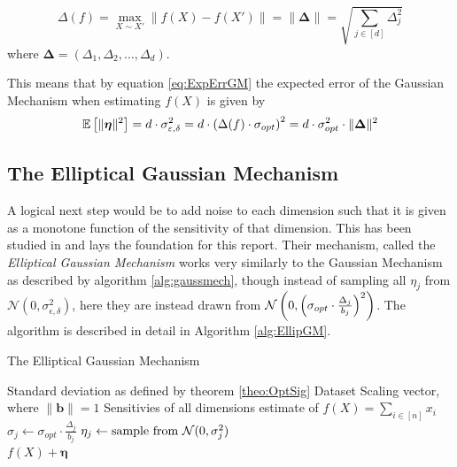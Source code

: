 \documentclass[a4paper,12pt]{article}
\newcommand{\Desc}[2]{\State \makebox[6em][l]{#1}#2}
\begin{document}
\begin{equation}
\label{eq:DelF}
    \Delta(f) = \max_{X \sim X'} \| f(X) - f(X') \| = 
    \|\bm{\Delta}\| =  \sqrt{\sum_{j \in [d]} \Delta_j^2} 
\end{equation}
where $\bm{\Delta} = (\Delta_1, \Delta_2, \dots, \Delta_d)$.

\noindent This means that by equation \eqref{eq:ExpErrGM} the expected error of the Gaussian Mechanism when estimating $f(X)$ is given by
\begin{equation}
\label{eq:GMErr}
    \mathbb{E} \left [ \| \bm{\eta} \|^2 \right] = d \cdot \sigma_{\varepsilon, \delta}^2 = d \cdot \left (\Delta(f) \cdot \sigma_{opt}\right)^2 =
    d  \cdot \sigma_{opt}^2 \cdot \| \bm{\Delta} \|^2 
\end{equation}
\subsection{The Elliptical Gaussian Mechanism}
A logical next step would be to add noise to each dimension such that it is given as a monotone function of the sensitivity of that dimension.
This has been studied in \cite{Lebeda2022} and lays the foundation for this report. Their mechanism, called the \textit{Elliptical Gaussian Mechanism}
works very similarly to the Gaussian Mechanism as described by algorithm \ref{alg:gaussmech}, though instead of sampling all $\eta_j$ from 
$\mathcal{N}(0,\sigma_{\epsilon, \delta}^2)$, here they are instead drawn from $\mathcal{N}\left (0,\left (\sigma_{opt}\cdot \frac{\Delta_j}{b_j}\right)^2\right)$. 
The algorithm is described in detail in Algorithm \ref{alg:EllipGM}.

\begin{algorithm}
\caption{The Elliptical Gaussian Mechanism}\label{alg:EllipGM}
\begin{algorithmic}
    \Input
    \Desc{$\sigma_{opt}$}{Standard deviation as defined by theorem \ref{theo:OptSig}}
    \Desc{$X \in \R^{n \times d}$}{Dataset}
    \Desc{$\bm{b} \in \R^{d}$}{Scaling vector, where $\|\bm{b}\| = 1$}
    \Desc{$\bm{\Delta} \in \R^{d}$}{Sensitivies of all dimensions}
    \EndInput
    \Output
    \State \edp estimate of $f(X) = \sum_{i \in [n]} x_i$
    \EndOutput
        \State $\sigma_j \gets \sigma_{opt} \cdot \frac{\Delta_j}{b_j}$
        \State $\eta_j \gets \textnormal{sample from } \mathcal{N}(0, \sigma_j^2)$
    \EndFor \\
    \Return $f(X) + \bm{\eta}$
\end{algorithmic}
\end{algorithm}
\end{document}
